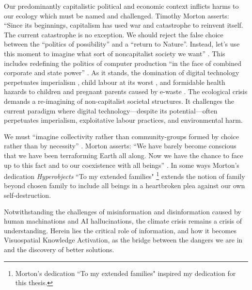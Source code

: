 Our predominantly capitalistic political and economic context inflicts harms to our ecology which must be named and challenged. Timothy Morton asserts: ``Since its beginnings, capitalism has used war and catastrophe to reinvent itself. The current catastrophe is no exception. We should reject the false choice between the “politics of possibility”  and a ``return to Nature”. Instead, let's use this moment to imagine what sort of noncapitalist society we want” \citep[p. 133]{morton_ecological_2012}. This includes redefining the politics of computer production ``in the face of combined corporate and state power” \citep[p. 1]{chan_politics_2013}. As it stands, the domination of digital technology perpetuates imperialism \citep[p. 1]{kwet_digital_2018}, child labour at its worst \citep[p. 36]{amnesty_international_this_2016}, and formidable health hazards to children and pregnant parents caused by e-waste \citep[p. 1]{heacock_e-waste_2016}. The ecological crisis demands a re-imagining of non-capitalist societal structures. It challenges the current paradigm where digital technology—despite its potential—often perpetuates imperialism, exploitative labour practices, and environmental harm.



We must ``imagine collectivity rather than community-groups formed by choice rather than by necessity” \citep[p. 135]{morton_ecological_2012}. Morton asserts: “We have barely become conscious that we have been terraforming Earth all along. Now we have the chance to face up to this fact and to our coexistence with all beings” \citep[p. 133]{morton_ecological_2012}. In some ways Morton's dedication \textit{Hyperobjects} \citep{morton_hyperobjects_2013} ``To my extended families" \footnote{Morton's dedication ``To my extended families" inspired my dedication for this thesis.} extends the notion of family beyond chosen family to include all beings in a heartbroken plea against our own self-destruction.

Notwithstanding the challenges of misinformation and disinformation caused by human machinations and AI hallucinations, the climate crisis remains a crisis of understanding. Herein lies the critical role of information, and how it becomes Visuospatial Knowledge Activation, as the bridge between the dangers we are in and the discovery of better solutions.




